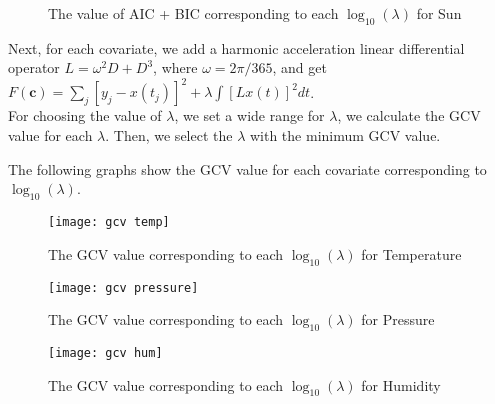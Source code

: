 \begin{figure}[H]
\centering  %
\caption{The value of AIC + BIC corresponding to each $\log_{10}(\lambda)$ for Sun}
\end{figure}

Next, for each covariate, we add a harmonic acceleration linear differential operator $L=\omega^2D+D^3$, where $\omega=2\pi/365$, and get $F(\bm c)=\sum_{j}[y_j-x(t_j)]^2+ \lambda\int[Lx(t)]^2dt$.\\
For choosing the value of $\lambda$, we set a wide range for $\lambda$, we calculate the GCV value for each $\lambda$. Then, we select the $\lambda$ with the minimum GCV value.

The following graphs show the GCV value for each covariate corresponding to $\log_{10}(\lambda)$.

\begin{figure}[H] %
\centering %
\texttt{[image: gcv temp]} %
\caption{The GCV value corresponding to each $\log_{10}(\lambda)$ for Temperature} %
\label{fig:gcvtemp} %
\end{figure}

\begin{figure}[H] %
\centering %
\texttt{[image: gcv pressure]} %
\caption{The GCV value corresponding to each $\log_{10}(\lambda)$ for Pressure} %
\label{fig: gcvpressure} %
\end{figure}

\begin{figure}[H] %
\centering %
\texttt{[image: gcv hum]} %
\caption{The GCV value corresponding to each $\log_{10}(\lambda)$ for Humidity} %
\label{fig: gcvhum} %
\end{figure}

